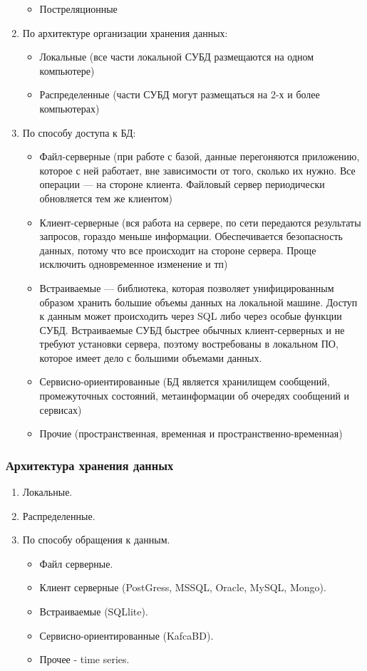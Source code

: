 \begin{enumerate}
\begin{itemize}
\begin{itemize}
		\end{itemize}
		\item Постреляционные
	\end{itemize}
	\item По архитектуре организации хранения данных:
	\begin{itemize}
		\item Локальные (все части локальной СУБД размещаются на одном компьютере)
		\item Распределенные (части СУБД могут размещаться на 2-х и более компьютерах) 
	\end{itemize}
	\item По способу доступа к БД:
	\begin{itemize}
		\item Файл-серверные (при работе с базой, данные перегоняются приложению, которое с ней работает, вне зависимости от того, сколько их нужно. Все операции --- на стороне клиента. Файловый сервер периодически обновляется тем же клиентом)
		\item Клиент-серверные (вся работа на сервере, по сети передаются результаты запросов, гораздо меньше информации. Обеспечивается безопасность данных, потому что все происходит на стороне сервера. Проще исключить одновременное изменение и тп)
		\item Встраиваемые --- библиотека, которая позволяет унифицированным образом хранить 
		большие объемы данных на локальной машине. Доступ к данным может происходить через SQL либо через 
		особые функции СУБД. Встраиваемые СУБД быстрее обычных клиент-серверных и не требуют установки 
		сервера, поэтому востребованы в локальном ПО, которое имеет дело с большими объемами данных.
		\item Сервисно-ориентированные  (БД является хранилищем сообщений, промежуточных состояний, метаинформации об очередях сообщений и сервисах)
		\item Прочие (пространственная, временная и пространственно-временная)
	\end{itemize}
\end{enumerate}

\subsubsection{Архитектура хранения данных}

\begin{enumerate}
	\item Локальные.
	\item Распределенные.
	\item По способу обращения к данным.
	\begin{itemize}
		\item Файл серверные.
		\item Клиент серверные (PostGress, MSSQL, Oracle, MySQL, Mongo).
		\item Встраиваемые (SQLlite).
		\item Сервисно-ориентированные (KafcaBD).
		\item Прочее - time series.
	\end{itemize}
\end{enumerate}

